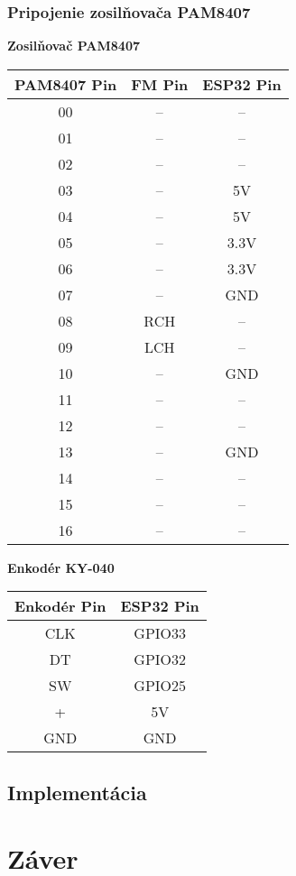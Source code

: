 \documentclass[11pt, a4paper]{article}
\begin{document}
\subsubsection{Pripojenie zosilňovača PAM8407}
\begin{minipage}[t]{0.48\textwidth}
\centering
\textbf{Zosilňovač PAM8407}
\begin{tabular}{|c|c|c|}
\hline
\textbf{PAM8407 Pin} & \textbf{FM Pin} & \textbf{ESP32 Pin}\\
\hline
00 & -- & -- \\
01 & -- & -- \\
02 & -- & -- \\
03 & -- & 5V \\
04 & -- & 5V \\
05 & -- & 3.3V \\
06 & -- & 3.3V \\
07 & -- & GND \\
08 & RCH & -- \\
09 & LCH & -- \\
10 & -- & GND \\
11 & -- & -- \\
12 & -- & -- \\
13 & -- & GND \\
14 & -- & -- \\
15 & -- & -- \\
16 & -- & -- \\
\hline
\end{tabular}
\end{minipage}
\hfill
\begin{minipage}[t]{0.48\textwidth}
\centering
\textbf{Enkodér KY-040}
\begin{tabular}{|c|c|}
\hline
\textbf{Enkodér Pin} & \textbf{ESP32 Pin} \\
\hline
CLK & GPIO33 \\
DT  & GPIO32 \\
SW  & GPIO25 \\
+   & 5V \\
GND & GND \\
\hline
\end{tabular}
\end{minipage}

\subsection{Implementácia}

\section{Záver}
\end{document}
